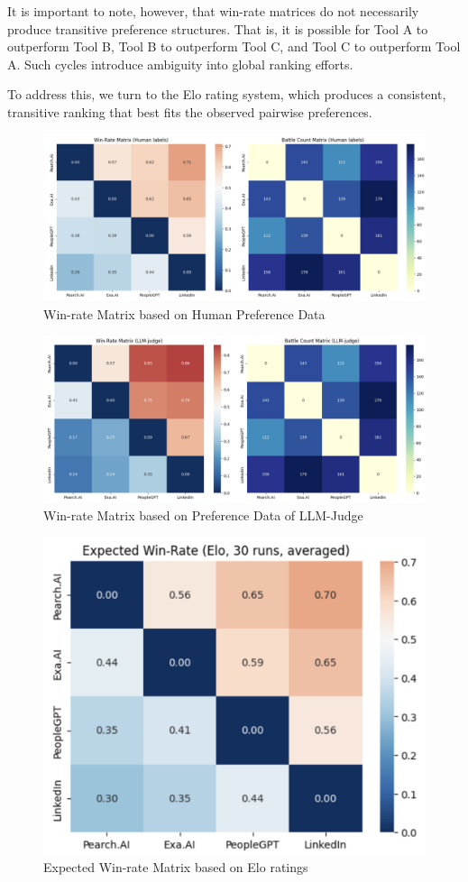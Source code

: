 \documentclass{article}
\begin{document}
It is important to note, however, that win-rate matrices do not necessarily produce transitive preference structures. That is, it is possible for Tool A to outperform Tool B, Tool B to outperform Tool C, and Tool C to outperform Tool A. Such cycles introduce ambiguity into global ranking efforts.

To address this, we turn to the Elo rating system, which produces a consistent, transitive ranking that best fits the observed pairwise preferences.


\begin{figure}
\centering
\includegraphics[width=1\linewidth]{win-rate-human.png}
\caption{\label{fig:win-rate-human}Win-rate Matrix based on Human Preference Data}
\end{figure}

\begin{figure}
\centering
\includegraphics[width=1\linewidth]{win-rate-llm.png}
\caption{\label{fig:win-rate-llm}Win-rate Matrix based on Preference Data of LLM-Judge}
\end{figure}

\begin{figure}
\centering
\includegraphics[width=0.5\linewidth]{win-rate-elo.png}
\caption{\label{fig:win-rate-elo}Expected Win-rate Matrix based on Elo ratings}
\end{figure}
\end{document}
